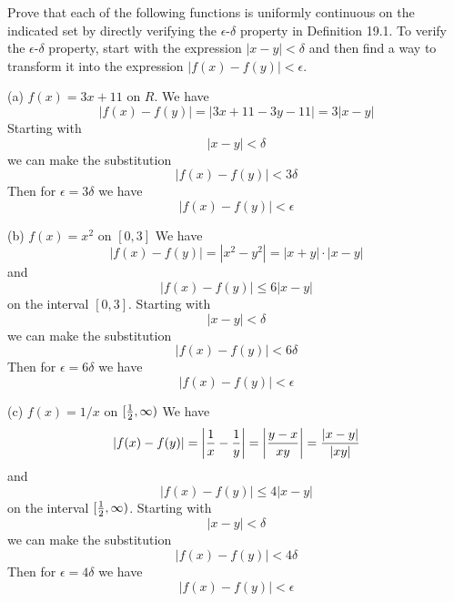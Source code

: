 
Prove that each of the following functions is uniformly continuous on the
indicated set by directly verifying the $\epsilon$-$\delta$ property in
Definition 19.1.
\medskip
To verify the $\epsilon$-$\delta$ property, start with the expression
$|x-y|<\delta$ and then find a way to transform it into the expression
$|f(x)-f(y)|<\epsilon$.

\medskip
(a) $f(x)=3x+11$ on $R$.
\medskip
We have
$$|f(x)-f(y)|=|3x+11-3y-11|=3|x-y|$$
Starting with
$$|x-y|<\delta$$
we can make the substitution
$$|f(x)-f(y)|<3\delta$$
Then for $\epsilon=3\delta$ we have
$$|f(x)-f(y)|<\epsilon$$

\medskip
(b) $f(x)=x^2$ on $[0,3]$
\medskip
We have
$$|f(x)-f(y)|=|x^2-y^2|=|x+y|\cdot|x-y|$$
and
$$|f(x)-f(y)|\le6|x-y|$$
on the interval $[0,3]$.
Starting with
$$|x-y|<\delta$$
we can make the substitution
$$|f(x)-f(y)|<6\delta$$
Then for $\epsilon=6\delta$ we have
$$|f(x)-f(y)|<\epsilon$$

\medskip
(c) $f(x)=1/x$ on $[{1\over2},\infty)$
\medskip
We have
$$|f(x)-f(y)|=\left|{1\over x}-{1\over y}\right|
=\left|{y-x}\over xy\right|
={|x-y|\over|xy|}$$
and
$$|f(x)-f(y)|\le4|x-y|$$
on the interval $[{1\over2},\infty)$.
Starting with
$$|x-y|<\delta$$
we can make the substitution
$$|f(x)-f(y)|<4\delta$$
Then for $\epsilon=4\delta$ we have
$$|f(x)-f(y)|<\epsilon$$
